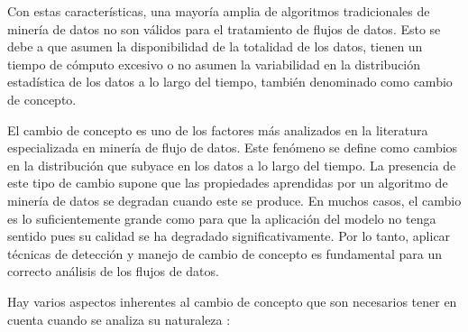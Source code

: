 \documentclass[c5paper,10pt,twoside]{book}	   	%
\begin{document}
Con estas características, una mayoría amplia de algoritmos tradicionales de minería de datos no son válidos para el tratamiento de flujos de datos. Esto se debe a que asumen la disponibilidad de la totalidad de los datos, tienen un tiempo de cómputo excesivo o no asumen la variabilidad en la distribución estadística de los datos a lo largo del tiempo, también denominado como cambio de concepto.

El cambio de concepto es uno de los factores más analizados en la literatura especializada en minería de flujo de datos. Este fenómeno se define como cambios en la distribución que subyace en los datos a lo largo del tiempo. La presencia de este tipo de cambio supone que las propiedades aprendidas por un algoritmo de minería de datos se degradan cuando este se produce. En muchos casos, el cambio es lo suficientemente grande como para que la aplicación del modelo no tenga sentido pues su calidad se ha degradado significativamente. Por lo tanto, aplicar técnicas de detección y manejo de cambio de concepto es fundamental para un correcto análisis de los flujos de datos. 



Hay varios aspectos inherentes al cambio de concepto que son necesarios tener en cuenta cuando se analiza su naturaleza \cite{Kshg18}:
\end{document}
